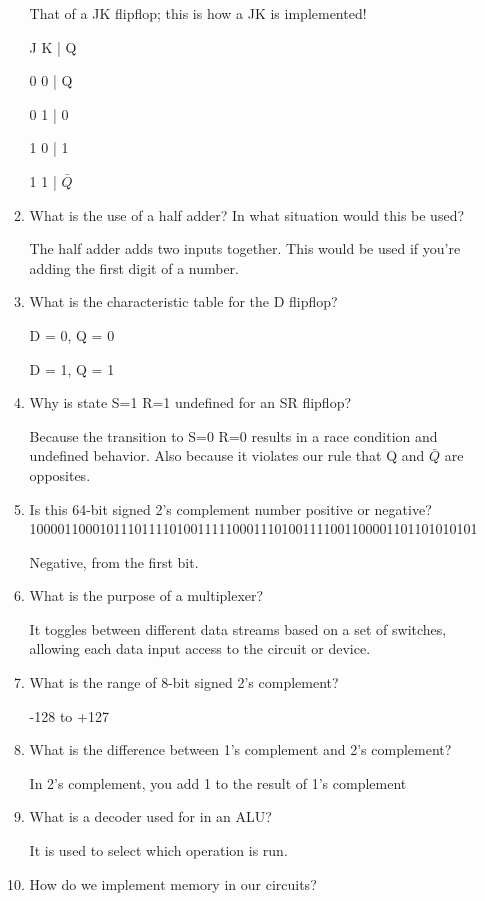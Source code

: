 \documentclass[10pt]{article}
\begin{document}
\begin{itemize}
\begin{enumerate}
That of a JK flipflop; this is how a JK is implemented!

J  K  | Q

0  0  | Q

0  1  | 0

1  0  | 1

1  1  | $\bar{Q}$

\item What is the use of a half adder?  In what situation would this be used?

The half adder adds two inputs together.  This would be used if you're adding the first digit of a number.

\item What is the characteristic table for the D flipflop?

D = 0, Q = 0

D = 1, Q = 1

\item Why is state S=1 R=1 undefined for an SR flipflop?

Because the transition to S=0 R=0 results in a race condition and undefined behavior.  Also because it violates our rule that Q and $\bar{Q}$ are opposites.

\item Is this 64-bit signed 2's complement number positive or negative? \\
1000011000101110111101001111100011101001111001100001101101010101

Negative, from the first bit.

\item What is the purpose of a multiplexer?

It toggles between different data streams based on a set of switches, allowing each data input access to the circuit or device.

\item What is the range of 8-bit signed 2's complement?

-128 to +127

\item What is the difference between 1's complement and 2's complement?

In 2's complement, you add 1 to the result of 1's complement

\item What is a decoder used for in an ALU?

It is used to select which operation is run.

\item How do we implement memory in our circuits?


\end{enumerate}
\end{itemize}
\end{document}
